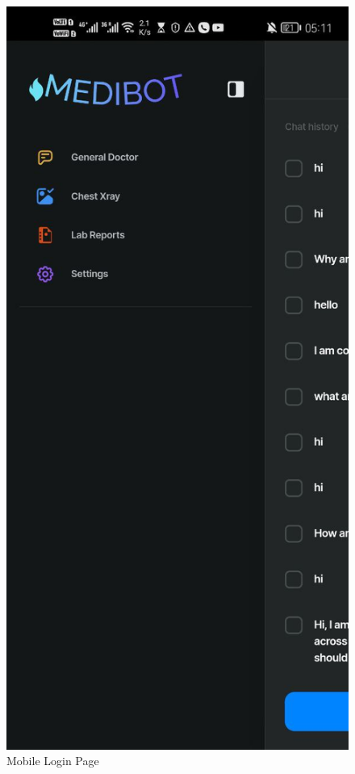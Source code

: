 \begin{figure}[htbp]
\begin{minipage}{0.3\textwidth}
        \caption{Mobile Login Page}
        \label{fig:mobile-login}
    \end{minipage}\hfill
    \begin{minipage}{0.3\textwidth}
        \centering
        \includegraphics[width=\textwidth]{./Figures/mobile-menu.jpg}

\end{minipage}
\end{figure}

